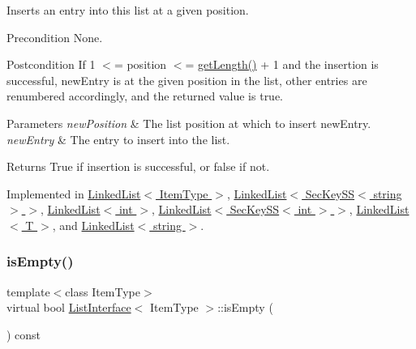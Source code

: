 Inserts an entry into this list at a given position. \begin{DoxyPrecond}{Precondition}
None. 
\end{DoxyPrecond}
\begin{DoxyPostcond}{Postcondition}
If 1 $<$= position $<$= \hyperlink{classListInterface_afc85695d4137f1e29ff02e179c9f3221}{get\+Length()} + 1 and the insertion is successful, new\+Entry is at the given position in the list, other entries are renumbered accordingly, and the returned value is true. 
\end{DoxyPostcond}

\begin{DoxyParams}{Parameters}
{\em new\+Position} & The list position at which to insert new\+Entry. \\
\hline
{\em new\+Entry} & The entry to insert into the list. \\
\hline
\end{DoxyParams}
\begin{DoxyReturn}{Returns}
True if insertion is successful, or false if not. 
\end{DoxyReturn}


Implemented in \hyperlink{classLinkedList_ae8a19375505e87e2e4fc0e9b5afe4d4d}{Linked\+List$<$ Item\+Type $>$}, \hyperlink{classLinkedList_ae8a19375505e87e2e4fc0e9b5afe4d4d}{Linked\+List$<$ Sec\+Key\+S\+S$<$ string $>$ $>$}, \hyperlink{classLinkedList_ae8a19375505e87e2e4fc0e9b5afe4d4d}{Linked\+List$<$ int $>$}, \hyperlink{classLinkedList_ae8a19375505e87e2e4fc0e9b5afe4d4d}{Linked\+List$<$ Sec\+Key\+S\+S$<$ int $>$ $>$}, \hyperlink{classLinkedList_ae8a19375505e87e2e4fc0e9b5afe4d4d}{Linked\+List$<$ T $>$}, and \hyperlink{classLinkedList_ae8a19375505e87e2e4fc0e9b5afe4d4d}{Linked\+List$<$ string $>$}.

\mbox{\label{classListInterface_a924f91e7f81d7dcd3fda79bbcc671394}} 
\subsubsection{\texorpdfstring{is\+Empty()}{isEmpty()}}
{\footnotesize\ttfamily template$<$class Item\+Type$>$ \\
virtual bool \hyperlink{classListInterface}{List\+Interface}$<$ Item\+Type $>$\+::is\+Empty (\begin{DoxyParamCaption}{ }\end{DoxyParamCaption}) const\hspace{0.3cm}{\ttfamily [pure virtual]}}

